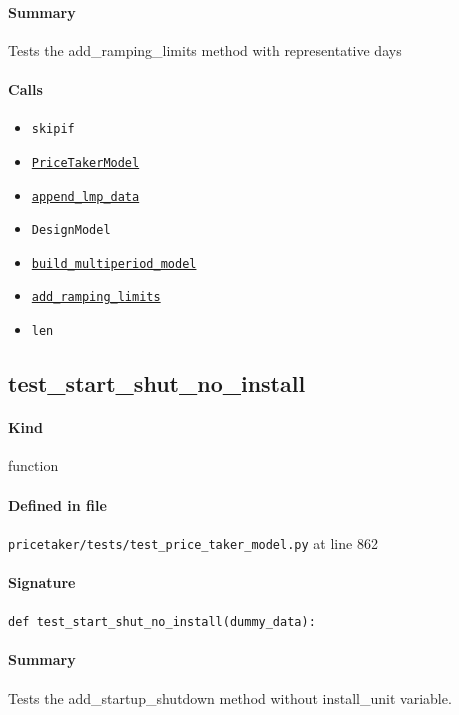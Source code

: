 \documentclass[11pt]{report}
\begin{document}
\paragraph{Summary} Tests the add\_ramping\_limits method with representative days
\paragraph{Calls}
\begin{itemize}[leftmargin=*]
  \item \texttt{skipif}
  \item \hyperref[def:pricetaker-price_taker_model.py:PriceTakerModel:L161]{\texttt{PriceTakerModel}}
  \item \hyperref[def:pricetaker-price_taker_model.py:PriceTakerModel.append_lmp_data:L221]{\texttt{append\_lmp\_data}}
  \item \texttt{DesignModel}
  \item \hyperref[def:pricetaker-price_taker_model.py:PriceTakerModel.build_multiperiod_model:L291]{\texttt{build\_multiperiod\_model}}
  \item \hyperref[def:pricetaker-price_taker_model.py:PriceTakerModel.add_ramping_limits:L723]{\texttt{add\_ramping\_limits}}
  \item \texttt{len}
\end{itemize}
\subsection{test\_start\_shut\_no\_install}
\label{def:pricetaker-tests-test_price_taker_model.py:test_start_shut_no_install:L862}
\paragraph{Kind} function
\paragraph{Defined in file} \texttt{pricetaker/tests/test\_price\_taker\_model.py} at line 862
\paragraph{Signature} \texttt{def test\_start\_shut\_no\_install(dummy\_data):}
\paragraph{Summary} Tests the add\_startup\_shutdown method without install\_unit variable.
\end{document}
